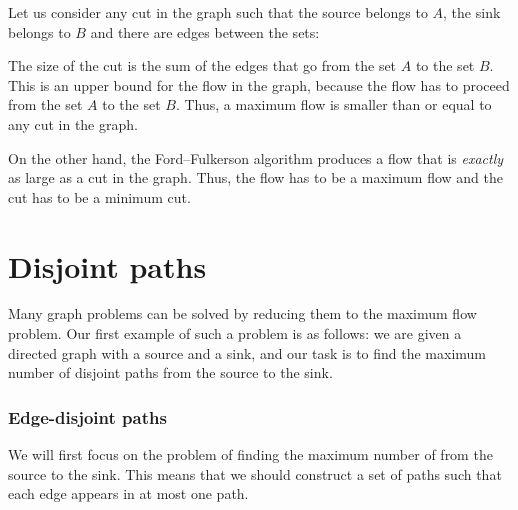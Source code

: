 Let us consider any cut in the graph
such that the source belongs to $A$,
the sink belongs to $B$
and there are edges between the sets:

\begin{center}
\end{center}

The size of the cut is the sum of the edges
that go from the set $A$ to the set $B$.
This is an upper bound for the flow
in the graph, because the flow has to proceed
from the set $A$ to the set $B$.
Thus, a maximum flow is smaller than or equal to
any cut in the graph.

On the other hand, the Ford–Fulkerson algorithm
produces a flow that is \emph{exactly} as large
as a cut in the graph.
Thus, the flow has to be a maximum flow
and the cut has to be a minimum cut.

\section{Disjoint paths}

Many graph problems can be solved by reducing
them to the maximum flow problem.
Our first example of such a problem is
as follows: we are given a directed graph
with a source and a sink,
and our task is to find the maximum number
of disjoint paths from the source to the sink.

\subsubsection{Edge-disjoint paths}

We will first focus on the problem of
finding the maximum number of
 from the source to the sink.
This means that we should construct a set of paths
such that each edge appears in at most one path.

